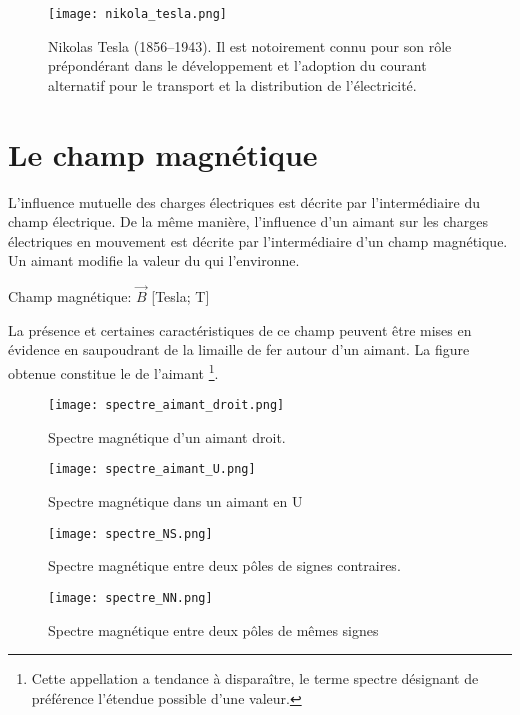 \begin{figure}[h]
    \centering
    \texttt{[image: nikola\_tesla.png]}
    \caption{Nikolas Tesla (1856--1943). Il est notoirement connu pour son rôle prépondérant dans le développement et l'adoption du courant alternatif pour le transport et la distribution de l'électricité.}
    \label{nikola_tesla}
\end{figure}

\newpage

\section{Le champ magnétique}
L'influence mutuelle des charges électriques est décrite par l'intermédiaire du champ électrique.
De la même manière, l'influence d'un aimant sur les charges électriques en mouvement est décrite par l'intermédiaire d'un champ magnétique.
Un aimant modifie la valeur du  qui l'environne.
\begin{encadre}
    Champ magnétique: \(\vec{B}\) [Tesla; T]
\end{encadre}
La présence et certaines caractéristiques de ce champ peuvent être mises en évidence en saupoudrant de la limaille de fer autour d'un aimant. La figure obtenue constitue le  de l'aimant \footnote{Cette appellation a tendance à disparaître, le terme spectre désignant de préférence l'étendue possible d'une valeur.}.

\begin{figure}[!ht]
    \centering
    \begin{minipage}[b]{.67\linewidth}
        \centering
        \texttt{[image: spectre\_aimant\_droit.png]}
        \caption{Spectre magnétique d'un aimant droit.}
        \label{spectre_aimant_droit}
    \end{minipage}
    \begin{minipage}[b]{.27\linewidth}
        \centering
        \texttt{[image: spectre\_aimant\_U.png]}
        \caption{Spectre magnétique dans un aimant en U}
        \label{spectre_aimant_U}
    \end{minipage}
\end{figure}

\begin{figure}[!ht]
    \centering
    \begin{minipage}[b]{.47\linewidth}
        \centering
        \texttt{[image: spectre\_NS.png]}
        \caption{Spectre magnétique entre deux pôles de signes contraires.}
        \label{spectre_NS}
    \end{minipage}
    \begin{minipage}[b]{.47\linewidth}
        \centering
        \texttt{[image: spectre\_NN.png]}
        \caption{Spectre magnétique entre deux pôles de mêmes signes}
        \label{spectre_NN}
    \end{minipage}
\end{figure}


